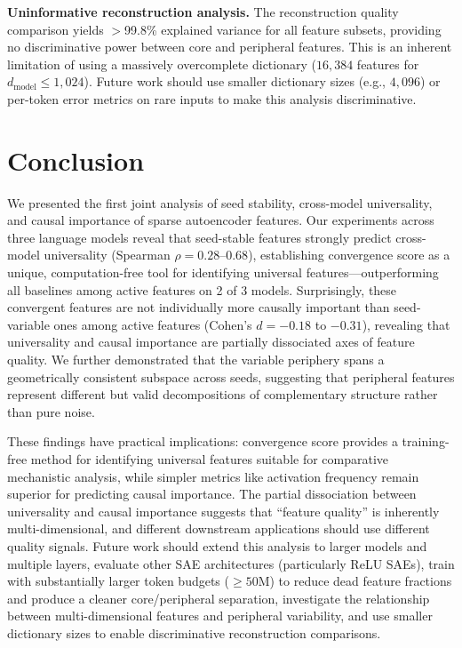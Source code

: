 \documentclass[final]{article}
\begin{document}
\textbf{Uninformative reconstruction analysis.} The reconstruction quality comparison yields $>$99.8\% explained variance for all feature subsets, providing no discriminative power between core and peripheral features. This is an inherent limitation of using a massively overcomplete dictionary ($16{,}384$ features for $d_{\text{model}} \leq 1{,}024$). Future work should use smaller dictionary sizes (e.g., $4{,}096$) or per-token error metrics on rare inputs to make this analysis discriminative.

\section{Conclusion}
\label{sec:conclusion}

We presented the first joint analysis of seed stability, cross-model universality, and causal importance of sparse autoencoder features. Our experiments across three language models reveal that seed-stable features strongly predict cross-model universality (Spearman $\rho = 0.28$--$0.68$), establishing convergence score as a unique, computation-free tool for identifying universal features---outperforming all baselines among active features on 2 of 3 models. Surprisingly, these convergent features are not individually more causally important than seed-variable ones among active features (Cohen's $d = -0.18$ to $-0.31$), revealing that universality and causal importance are partially dissociated axes of feature quality. We further demonstrated that the variable periphery spans a geometrically consistent subspace across seeds, suggesting that peripheral features represent different but valid decompositions of complementary structure rather than pure noise.

These findings have practical implications: convergence score provides a training-free method for identifying universal features suitable for comparative mechanistic analysis, while simpler metrics like activation frequency remain superior for predicting causal importance. The partial dissociation between universality and causal importance suggests that ``feature quality'' is inherently multi-dimensional, and different downstream applications should use different quality signals. Future work should extend this analysis to larger models and multiple layers, evaluate other SAE architectures (particularly ReLU SAEs), train with substantially larger token budgets (${\geq}50$M) to reduce dead feature fractions and produce a cleaner core/peripheral separation, investigate the relationship between multi-dimensional features \citep{engels2025multidim} and peripheral variability, and use smaller dictionary sizes to enable discriminative reconstruction comparisons.
\end{document}
